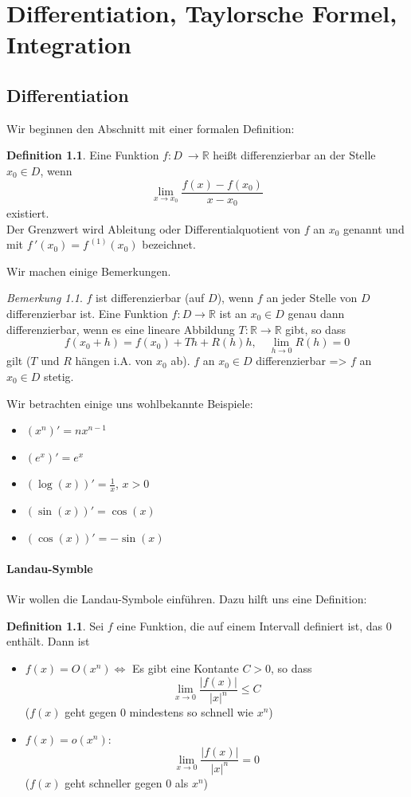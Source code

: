 \documentclass[fontsize=12pt,paper=a4,twoside,bibtotoc,idxtotoc,
liststotoc,pagesize,BCOR1.2cm,DIV15,chapterprefix,pagesize=pdftex]{scrbook}
\theoremstyle{plain}
\theoremstyle{definition}
\newtheorem{df}[equation]{Definition}
\theoremstyle{remark}
\newtheorem{bem}[equation]{Bemerkung}
\begin{document}
\chapter{Differentiation, Taylorsche Formel, Integration}
\section{Differentiation}
Wir beginnen den Abschnitt mit einer formalen Definition:
\begin{df}
Eine Funktion $f: D \ \rightarrow \mathbb{R}$ heißt differenzierbar an
der Stelle $x_0 \in D$, wenn 
\[ \lim_{x \rightarrow x_0} \frac{f(x)-f(x_0)}{x -x_0} \]
existiert. \\
Der Grenzwert wird Ableitung oder Differentialquotient
von $f$ an $x_0$ genannt und mit $f\,'(x_0)=f^{\,(1)} (x_0)$ bezeichnet.
\end{df}
Wir machen einige Bemerkungen.
\begin{bem}
 $f$ ist differenzierbar (auf $D$), wenn $f$ an jeder
Stelle von $D$ differenzierbar ist. 
 Eine Funktion $f:D \rightarrow \mathbb{R}$ ist an $x_0 \in D$
genau dann differenzierbar, wenn es eine lineare Abbildung
$T:\mathbb{R} \rightarrow \mathbb{R}$ gibt, so dass 
\[ f(x_0+h)=f(x_0) +Th + R(h)h, \quad \lim_{h \rightarrow 0} R(h)=0 \]
gilt ($T$ und $R$ hängen i.A. von $x_0$ ab). 
 $f$ an $x_0 \in D$ differenzierbar => $f$ an $x_0 \in D$ stetig.
\end{bem}
Wir betrachten einige uns wohlbekannte Beispiele:
\begin{itemize}
\item $(x^n)'=n x^{n-1}$
\item $(e^x)'=e^x$
\item $(\log(x))'= \frac{1}{x}$, $x>0$
\item $(\sin(x))'=\cos(x)$
\item $(\cos(x))'=-\sin(x)$
\end{itemize}

\subsubsection{Landau-Symble}
Wir wollen die Landau-Symbole einführen. Dazu hilft uns eine Definition:
\begin{df}
Sei $f$ eine Funktion, die auf einem Intervall definiert ist, das $0$
enthält. Dann ist 
\begin{itemize}
\item  $f(x)=O(x^n)\Longleftrightarrow$ Es gibt eine Kontante $C >0$, so dass
\[  \lim_{x \rightarrow 0} \frac{|f(x)|}{|x|^n} \leq C\]
($f(x)$ geht gegen $0$ mindestens so schnell wie $x^n$)
\item $f(x)=o(x^n)$: 
\[  
 \lim_{x \rightarrow 0} \frac{|f(x)|}{|x|^n}=0
\]
($f(x)$ geht schneller gegen $0$ als $x^n$)
\end{itemize}
\end{df}
\end{document}

